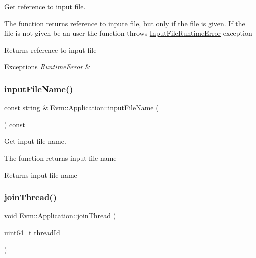 Get reference to input file. 

The function returns reference to inpute file, but only if the file is given. If the file is not given be an user the function throws \mbox{\hyperlink{struct_evm_1_1_input_file_runtime_error}{Input\+File\+Runtime\+Error}} exception \begin{DoxyReturn}{Returns}
reference to input file 
\end{DoxyReturn}

\begin{DoxyExceptions}{Exceptions}
{\em \mbox{\hyperlink{struct_evm_1_1_runtime_error}{Runtime\+Error}}} & \\
\hline
\end{DoxyExceptions}
\mbox{\label{struct_evm_1_1_application_ac7916137b6e8cb5ae323e1ec9ce9f050}} 
\subsubsection{\texorpdfstring{input\+File\+Name()}{inputFileName()}}
{\footnotesize\ttfamily const string \& Evm\+::\+Application\+::input\+File\+Name (\begin{DoxyParamCaption}{ }\end{DoxyParamCaption}) const}



Get input file name. 

The function returns input file name \begin{DoxyReturn}{Returns}
input file name 
\end{DoxyReturn}
\mbox{\label{struct_evm_1_1_application_a71ad6065512bd28e0208fee37597484b}} 
\subsubsection{\texorpdfstring{join\+Thread()}{joinThread()}}
{\footnotesize\ttfamily void Evm\+::\+Application\+::join\+Thread (\begin{DoxyParamCaption}\item[{uint64\+\_\+t}]{thread\+Id }\end{DoxyParamCaption})}



